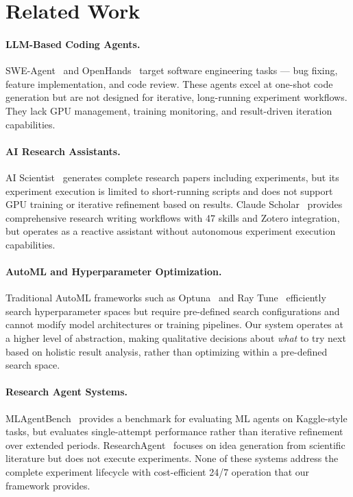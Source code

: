 \section{Related Work}
\label{sec:related}

\paragraph{LLM-Based Coding Agents.}
SWE-Agent~\cite{swe-agent} and OpenHands~\cite{openhands} target software engineering tasks --- bug fixing, feature implementation, and code review. These agents excel at one-shot code generation but are not designed for iterative, long-running experiment workflows. They lack GPU management, training monitoring, and result-driven iteration capabilities.

\paragraph{AI Research Assistants.}
AI Scientist~\cite{ai-scientist} generates complete research papers including experiments, but its experiment execution is limited to short-running scripts and does not support GPU training or iterative refinement based on results. Claude Scholar~\cite{claude-scholar} provides comprehensive research writing workflows with 47 skills and Zotero integration, but operates as a reactive assistant without autonomous experiment execution capabilities.

\paragraph{AutoML and Hyperparameter Optimization.}
Traditional AutoML frameworks such as Optuna~\cite{optuna} and Ray Tune~\cite{ray-tune} efficiently search hyperparameter spaces but require pre-defined search configurations and cannot modify model architectures or training pipelines. Our system operates at a higher level of abstraction, making qualitative decisions about \textit{what} to try next based on holistic result analysis, rather than optimizing within a pre-defined search space.

\paragraph{Research Agent Systems.}
MLAgentBench~\cite{mlagentbench} provides a benchmark for evaluating ML agents on Kaggle-style tasks, but evaluates single-attempt performance rather than iterative refinement over extended periods. ResearchAgent~\cite{researchagent} focuses on idea generation from scientific literature but does not execute experiments. None of these systems address the complete experiment lifecycle with cost-efficient 24/7 operation that our framework provides.
